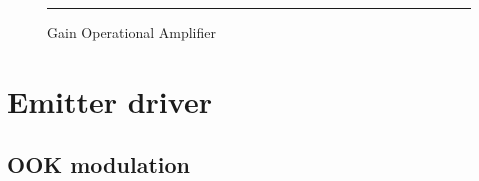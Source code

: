 \begin{figure}[htbp]
    \centering
    \rule{35em}{0.5pt}
    \caption{Gain Operational Amplifier}
    \label{fig:lpf}
\end{figure}


\section{Emitter driver}

\subsection{OOK modulation}
